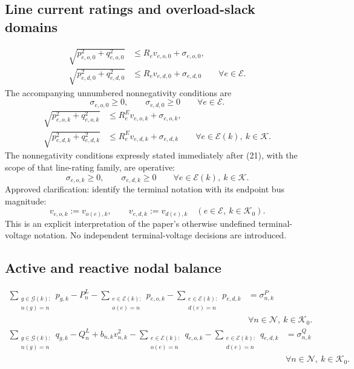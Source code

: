 \documentclass{article}
\begin{document}
\subsection*{Line current ratings and overload-slack domains}
\begin{equation}
\begin{aligned}
\sqrt{p_{e,o,0}^{2}+q_{e,o,0}^{2}}&\leq R_ev_{e,o,0}+\sigma_{e,o,0},\\
\sqrt{p_{e,d,0}^{2}+q_{e,d,0}^{2}}&\leq R_ev_{e,d,0}+\sigma_{e,d,0}
\qquad\forall e\in\mathcal E.
\end{aligned}\tag{20}
\end{equation}
The accompanying unnumbered nonnegativity conditions are
\[
\sigma_{e,o,0}\geq0,\qquad\sigma_{e,d,0}\geq0
\qquad\forall e\in\mathcal E.
\]
\begin{equation}
\begin{aligned}
\sqrt{p_{e,o,k}^{2}+q_{e,o,k}^{2}}&\leq R_e^Ev_{e,o,k}+\sigma_{e,o,k},\\
\sqrt{p_{e,d,k}^{2}+q_{e,d,k}^{2}}&\leq R_e^Ev_{e,d,k}+\sigma_{e,d,k}
\qquad\forall e\in\mathcal E(k),\ k\in\mathcal K.
\end{aligned}\tag{21}
\end{equation}
The nonnegativity conditions expressly stated immediately after (21), with the scope of that line-rating family, are operative:
\[
\sigma_{e,o,k}\geq0,\qquad\sigma_{e,d,k}\geq0
\qquad\forall e\in\mathcal E(k),\ k\in\mathcal K.
\]
Approved clarification: identify the terminal notation with its endpoint bus magnitude:
\[
 v_{e,o,k}:=v_{o(e),k},\qquad v_{e,d,k}:=v_{d(e),k}
 \quad(e\in\mathcal E,\ k\in\mathcal K_0).
\]
This is an explicit interpretation of the paper's otherwise undefined terminal-voltage notation. No independent terminal-voltage decisions are introduced.

\subsection*{Active and reactive nodal balance}
\begin{equation}
\begin{aligned}
\sum_{\substack{g\in\mathcal G(k):\\n(g)=n}}p_{g,k}-P_n^L
-\sum_{\substack{e\in\mathcal E(k):\\o(e)=n}}p_{e,o,k}
-\sum_{\substack{e\in\mathcal E(k):\\d(e)=n}}p_{e,d,k}
&=\sigma_{n,k}^P\\[-1mm]
&\forall n\in\mathcal N,\ k\in\mathcal K_0.
\end{aligned}\tag{22}
\end{equation}
\begin{equation}
\begin{aligned}
\sum_{\substack{g\in\mathcal G(k):\\n(g)=n}}q_{g,k}-Q_n^L+b_{n,k}v_{n,k}^{2}
-\sum_{\substack{e\in\mathcal E(k):\\o(e)=n}}q_{e,o,k}
-\sum_{\substack{e\in\mathcal E(k):\\d(e)=n}}q_{e,d,k}
&=\sigma_{n,k}^Q\\[-1mm]
&\forall n\in\mathcal N,\ k\in\mathcal K_0.
\end{aligned}\tag{23}
\end{equation}
\end{document}
